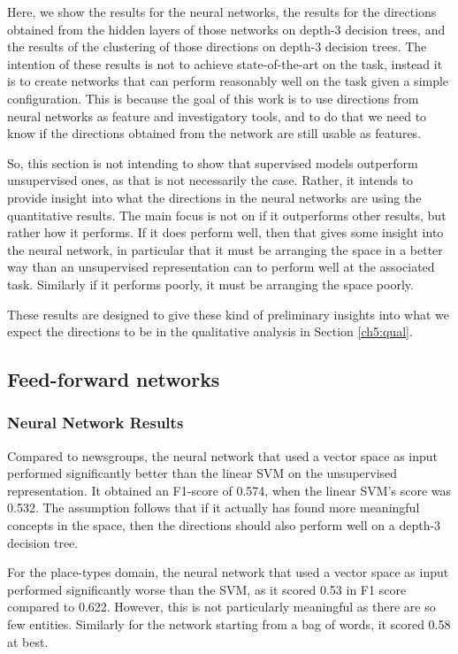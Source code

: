 Here, we show the results for the neural networks, the results for the directions obtained from the hidden layers of those networks on depth-3 decision trees, and the results of the clustering of those directions on depth-3 decision trees. The intention of these results is not to achieve state-of-the-art on the task, instead it is to create networks that can perform reasonably well on the task given a simple configuration. This is because the goal of this work is to use directions from neural networks as feature and investigatory tools, and to do that we need to know if the directions obtained from the network are still usable as features.

So, this section is not intending to show that supervised models outperform unsupervised ones, as that is not necessarily the case. Rather, it intends to provide insight into what the directions in the neural networks are using the quantitative results. The main focus is not on if it outperforms other results, but rather how it performs. If it does perform well, then that gives some insight into the neural network, in particular that it must be arranging the space in a better way than an unsupervised representation can to perform well at the associated task. Similarly if it performs poorly, it must be arranging the space poorly. 

These results are designed to give these kind of preliminary insights into what we expect the directions to be in the qualitative analysis in Section \ref{ch5:qual}.

\subsection{Feed-forward networks}

\subsubsection{Neural Network Results}

Compared to newsgroups, the neural network that used a vector space as input performed significantly better than the linear SVM on the unsupervised representation. It obtained an F1-score of 0.574, when the linear SVM's score was 0.532. The assumption follows that if it actually has found more meaningful concepts in the space, then the directions should also perform well on a depth-3 decision tree.

For the place-types domain, the neural network that used a vector space as input performed significantly worse than the SVM, as it scored 0.53 in F1 score compared to 0.622. However, this is not particularly meaningful as there are so few entities. Similarly for the network starting from a bag of words, it scored 0.58 at best.

